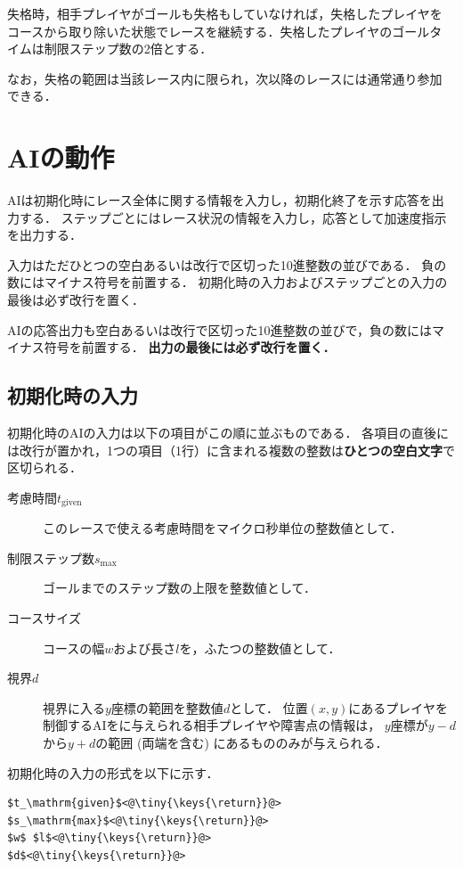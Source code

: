 \documentclass[11pt]{jarticle}
\begin{document}
失格時，相手プレイヤがゴールも失格もしていなければ，失格したプレイヤを
コースから取り除いた状態でレースを継続する．失格したプレイヤのゴールタ
イムは制限ステップ数の2倍とする．

なお，失格の範囲は当該レース内に限られ，次以降のレースには通常通り参加
できる．

\section{AIの動作}
AIは初期化時にレース全体に関する情報を入力し，初期化終了を示す応答を出
力する． ステップごとにはレース状況の情報を入力し，応答として加速度指示
を出力する．

入力はただひとつの空白あるいは改行で区切った10進整数の並びである．
負の数にはマイナス符号を前置する．
初期化時の入力およびステップごとの入力の最後は必ず改行を置く．

AIの応答出力も空白あるいは改行で区切った10進整数の並びで，負の数にはマ
イナス符号を前置する．  {\bf 出力の最後には必ず改行を置く．}

\subsection{初期化時の入力}
初期化時のAIの入力は以下の項目がこの順に並ぶものである．
各項目の直後には改行が置かれ，1つの項目（1行）に含まれる複数の整数は{\bf ひとつの空白文字}で区切られる．
\begin{description}
\item[考慮時間$t_\mathrm{given}$] このレースで使える考慮時間をマイクロ秒単位の整数値として．
\item[制限ステップ数$s_\mathrm{max}$] ゴールまでのステップ数の上限を整数値として．
\item[コースサイズ] コースの幅$w$および長さ$l$を，ふたつの整数値として．
\item[視界$d$] 視界に入る$y$座標の範囲を整数値$d$として．
  位置$(x,y)$にあるプレイヤを制御するAIをに与えられる相手プレイヤや障害点の情報は，
  $y$座標が$y-d$から$y+d$の範囲 (両端を含む) にあるもののみが与えられる．
\end{description}

\makeatletter
\def\lst@visiblespace{$\color{Gray}{}_{
  \mbox{\kern.06em\vrule \@height.3ex}%
  \vbox{\hrule \@width.3em}%
  \hbox{\vrule \@height.3ex}}$}
\makeatother


初期化時の入力の形式を以下に示す．
\begin{lstlisting}
$t_\mathrm{given}$<@\tiny{\keys{\return}}@>
$s_\mathrm{max}$<@\tiny{\keys{\return}}@>
$w$ $l$<@\tiny{\keys{\return}}@>
$d$<@\tiny{\keys{\return}}@>
\end{lstlisting}
\end{document}
